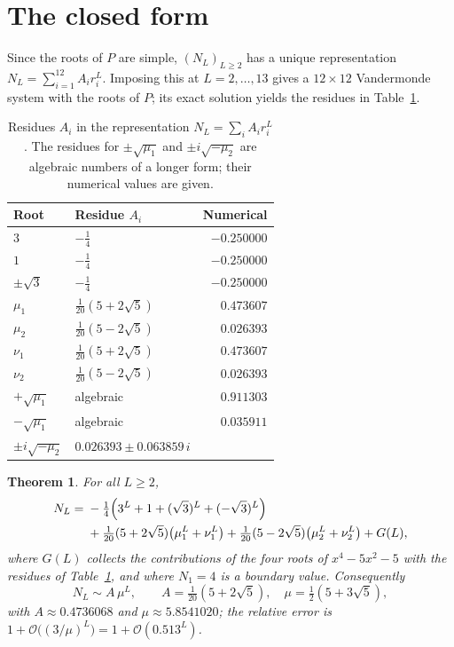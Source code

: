 \documentclass[11pt,a4paper]{article}
\theoremstyle{plain}
\newtheorem{theorem}{Theorem}[section]
\theoremstyle{definition}
\theoremstyle{remark}
\newcommand{\bigO}{\mathcal{O}}
\numberwithin{equation}{section}
\begin{document}
\section{The closed form}\label{sec:closed}

Since the roots of $P$ are simple, $(N_L)_{L\ge2}$ has a unique
representation $N_L=\sum_{i=1}^{12}A_i r_i^{L}$. Imposing this at
$L=2,\dots,13$ gives a $12\times12$ Vandermonde system with the roots of
$P$; its exact solution yields the residues in Table~\ref{tab:residues}.

\begin{table}[htbp]
\centering
\caption{Residues $A_i$ in the representation $N_L=\sum_i A_i r_i^{L}$.
The residues for $\pm\sqrt{\mu_1}$ and $\pm i\sqrt{-\mu_2}$ are algebraic
numbers of a longer form; their numerical values are given.}
\label{tab:residues}
\smallskip
\small
\begin{tabular}{@{}l l r@{}}
\toprule
Root & Residue $A_i$ & Numerical \\
\midrule
$3$ & $-\tfrac14$ & $-0.250000$ \\
$1$ & $-\tfrac14$ & $-0.250000$ \\
$\pm\sqrt3$ & $-\tfrac14$ & $-0.250000$ \\
$\mu_1$ & $\tfrac1{20}(5+2\sqrt5)$ & $\phantom{-}0.473607$ \\
$\mu_2$ & $\tfrac1{20}(5-2\sqrt5)$ & $\phantom{-}0.026393$ \\
$\nu_1$ & $\tfrac1{20}(5+2\sqrt5)$ & $\phantom{-}0.473607$ \\
$\nu_2$ & $\tfrac1{20}(5-2\sqrt5)$ & $\phantom{-}0.026393$ \\
$+\sqrt{\mu_1}$ & algebraic & $\phantom{-}0.911303$ \\
$-\sqrt{\mu_1}$ & algebraic & $\phantom{-}0.035911$ \\
$\pm i\sqrt{-\mu_2}$ & $0.026393\pm0.063859\,i$ & \\
\bottomrule
\end{tabular}
\end{table}

\begin{theorem}\label{thm:closed}
For all $L\ge2$,
\begin{equation}\label{eq:closed}
\begin{aligned}
N_L={}&-\tfrac14\Bigl(3^{L}+1+(\sqrt3)^{L}+(-\sqrt3)^{L}\Bigr)\\
      &+\tfrac1{20}(5+2\sqrt5)\bigl(\mu_1^{L}+\nu_1^{L}\bigr)
       +\tfrac1{20}(5-2\sqrt5)\bigl(\mu_2^{L}+\nu_2^{L}\bigr)+G(L),
\end{aligned}
\end{equation}
where $G(L)$ collects the contributions of the four roots of
$x^{4}-5x^{2}-5$ with the residues of Table~\ref{tab:residues}, and where
$N_1=4$ is a boundary value. Consequently
\begin{equation}\label{eq:asympt}
\boxed{\;N_L\sim A\,\mu^{L},\qquad A=\tfrac1{20}(5+2\sqrt5),\quad
\mu=\tfrac12(5+3\sqrt5),\;}
\end{equation}
with $A\approx0.4736068$ and $\mu\approx5.8541020$; the relative error is
$1+\bigO\!\bigl((3/\mu)^{L}\bigr)=1+\bigO(0.513^{L})$.
\end{theorem}
\end{document}
